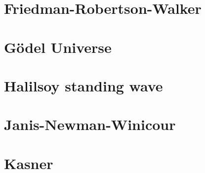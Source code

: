 \documentclass[10pt,twoside,notitlepage,a4paper,fleqn,openbib]{report}
\begin{document}
\clearpage
\section{Friedman-Robertson-Walker}
\setcounter{equation}{0}

\clearpage
\section{G\"odel Universe}
\setcounter{equation}{0}

\clearpage
\section{Halilsoy standing wave}
\setcounter{equation}{0}

\clearpage
\section{Janis-Newman-Winicour}
\setcounter{equation}{0}

\clearpage
\section{Kasner}
\setcounter{equation}{0}
\end{document}
